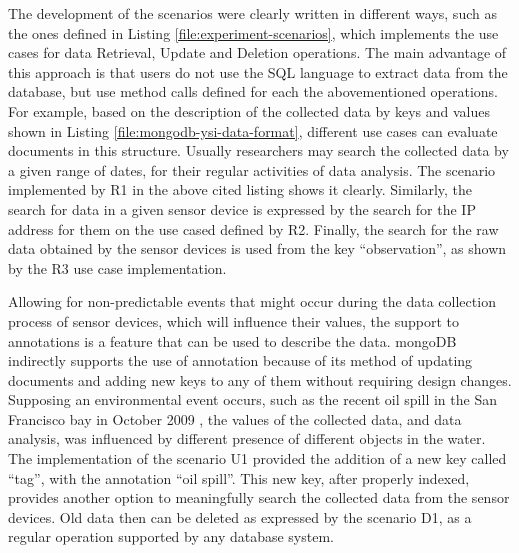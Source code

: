 The development of the scenarios were clearly written in different ways, such
as the ones defined in Listing \ref{file:experiment-scenarios}, which
implements the use cases for data Retrieval, Update and Deletion operations. The
main advantage of this approach is that users do not use the SQL language to extract
data from the database, but use method calls defined for each the
abovementioned operations. For example, based on the description of the
collected data by keys and values shown in Listing
\ref{file:mongodb-ysi-data-format}, different use cases can evaluate documents
in this structure. Usually researchers may search the collected data by a
given range of dates, for their regular activities of data analysis. The
scenario implemented by R1 in the above cited listing shows it clearly.
Similarly, the search for data in a given sensor device is expressed by the
search for the IP address for them on the use cased defined by R2. Finally,
the search for the raw data obtained by the sensor devices is used from the
key ``observation'', as shown by the R3 use case implementation.

Allowing for non-predictable events that might occur during the data
collection process of sensor devices, which will influence their values, the
support to annotations is a feature that can be used to describe the data.
mongoDB indirectly supports the use of annotation because of its method
of updating documents and adding new keys to any of them without requiring
design changes. Supposing an environmental event occurs, such as the recent oil
spill in the San Francisco bay in October 2009 \cite{sfbay-oilspill2009}, the
values of the collected data, and data analysis, was influenced by different
presence of different objects in the water. The implementation of the scenario
U1 provided the addition of a new key called ``tag'', with the annotation ``oil
spill''. This new key, after properly indexed, provides another option to
meaningfully search the collected data from the sensor devices. Old data then
can be deleted as expressed by the scenario D1, as a regular operation
supported by any database system.

